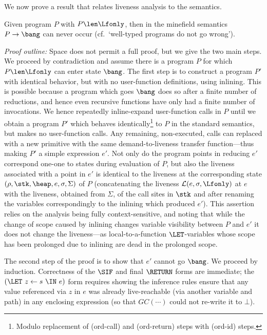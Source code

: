  We now prove a result that relates
liveness analysis to the semantics.
\begin{proposition}
Given program $P$ with $P \len \Lfonly$, then in the minefield
 semantics $P \rightarrow \bang$ can never occur
 (cf.\ `well-typed programs do not go wrong').
\end{proposition}
\textit{Proof outline:}
Space does not permit a full proof, but we give the two main steps.
We proceed by contradiction and assume there is a program $P$ for which
$P \len \Lfonly$ can enter state $\bang$.
The first step is to construct a program $P'$ with identical behavior, but with
no user-function definitions, using inlining.
This is possible because a program which goes $\bang$ does so after a finite number
of reductions, and hence even recursive functions have only had a finite number of
invocations.
We hence repeatedly inline-expand user-function calls in $P$
until we obtain a program $P'$ which behaves identically\footnote{
Modulo replacement of
({\sc ord-call}) and
({\sc ord-return}) steps with
({\sc ord-id}) steps.
}
to $P$ in the standard semantics, but makes no user-function calls.
Any remaining, non-executed, calls can 
replaced with a new primitive with the same
demand-to-liveness transfer function---thus making
$P'$ a simple expression $e'$.
Not only do the program points in reducing $e'$ correspond
one-one to states during evaluation of $P$,
but also the liveness associated with a point
in $e'$ is identical to the liveness at the corresponding state
$(\rho, \stk, \heap, e, \sigma, \Sigma)$ of $P$ (concatenating the liveness
$\mathcal{L}(e,\sigma,\Lfonly)$ at $e$
with the liveness, obtained from $\Sigma$, of the call sites in $\stk$ and
after renaming the variables correspondingly to the inlining which produced $e'$).
This assertion relies on the analysis being fully context-sensitive, and noting that
while the change of scope caused by inlining changes variable visibility
between $P$ and $e'$ it does not change the liveness---as local-to-a-function
$\LET$-variables whose scope has been prolonged due to inlining
are dead in the prolonged scope.

The second step of the proof is to show that $e'$ cannot go $\bang$.
We proceed by induction.
Correctness of the $\SIF$ and final $\RETURN$ forms are immediate;
the $(\LET~z\leftarrow s~\IN~e)$ form requires showing
the inference rules ensure that any value referenced via $z$ in $e$
was already live-reachable (via another variable and path) in any
enclosing expression (so that $\mathit{GC}(\cdots)$ could not re-write it to $\bot$).

